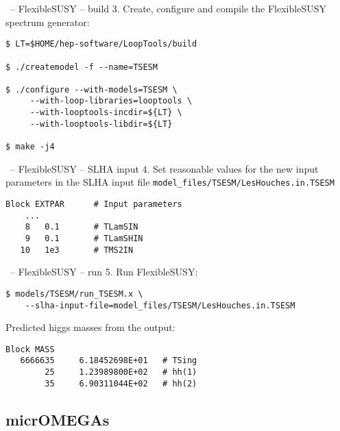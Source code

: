 \documentclass[11pt]{beamer}
\begin{document}

\begin{frame}[fragile]{\insertsection\ -- FlexibleSUSY -- build}
  3. Create, configure and compile the FlexibleSUSY spectrum
  generator:
  \begin{lstlisting}
$ LT=$HOME/hep-software/LoopTools/build

$ ./createmodel -f --name=TSESM

$ ./configure --with-models=TSESM \
     --with-loop-libraries=looptools \
     --with-looptools-incdir=${LT} \
     --with-looptools-libdir=${LT}

$ make -j4\end{lstlisting}%
\end{frame}


\begin{frame}[fragile]{\insertsection\ -- FlexibleSUSY -- SLHA input}
  4. Set reasonable values for the new input parameters in the SLHA
  input file \texttt{model\_files/TSESM/LesHouches.in.TSESM}
  \begin{lstlisting}
Block EXTPAR      # Input parameters
    ...
    8   0.1       # TLamSIN
    9   0.1       # TLamSHIN
   10   1e3       # TMS2IN\end{lstlisting}%
\end{frame}


\begin{frame}[fragile]{\insertsection\ -- FlexibleSUSY -- run}
  5. Run FlexibleSUSY:
  \begin{lstlisting}
$ models/TSESM/run_TSESM.x \
    --slha-input-file=model_files/TSESM/LesHouches.in.TSESM\end{lstlisting}%
  Predicted higgs masses from the output:
  \begin{lstlisting}
Block MASS
   6666635     6.18452698E+01   # TSing
        25     1.23989800E+02   # hh(1)
        35     6.90311044E+02   # hh(2)\end{lstlisting}
\end{frame}


\subsection{micrOMEGAs}
\end{document}
